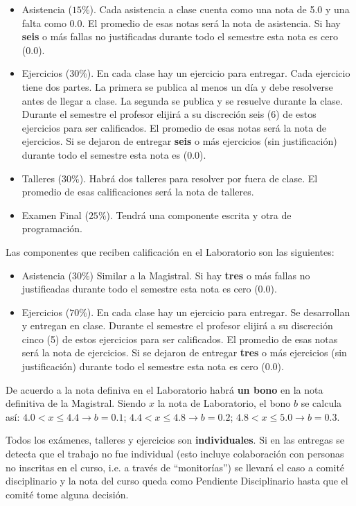 \documentclass[letterpaper,10pt,onecolumn]{article}
\begin{document}
\begin{itemize}
\item Asistencia ($15\%$). Cada asistencia a clase cuenta como una
  nota de 5.0 y una falta como 0.0. El promedio de esas notas ser\'a
  la nota de asistencia. 
  Si hay {\bf seis} o m\'as fallas no justificadas durante todo el
  semestre esta nota es cero (0.0).
\item Ejercicios ($30\%$). En cada clase hay un ejercicio para
  entregar. Cada ejercicio tiene dos partes. 
  La primera se publica al menos un d\'ia y debe resolverse antes de
  llegar a clase.
  La segunda se publica y se resuelve durante la clase.
  Durante el semestre el profesor elijir\'a a su discreci\'on seis (6)
  de estos ejercicios para ser calificados. 
  El promedio de esas notas ser\'a la nota de ejercicios.
  Si se dejaron de entregar {\bf seis} o m\'as ejercicios (sin
  justificaci\'on) durante todo el semestre esta nota es
  (0.0). 
\item Talleres ($30\%$). Habr\'a dos talleres para resolver por fuera de
  clase. El promedio de esas calificaciones ser\'a la nota de talleres.
\item Examen Final ($25\%$). Tendr\'a una componente escrita y otra de
  programaci\'on. 
\end{itemize}

Las componentes que reciben calificaci\'on en el Laboratorio son las
siguientes:
\begin{itemize}
\item Asistencia ($30\%$) Similar a la Magistral.
  Si hay {\bf tres} o m\'as fallas no justificadas durante todo el
  semestre esta nota es cero (0.0).
\item Ejercicios ($70\%$). En cada clase hay un ejercicio para
  entregar. Se desarrollan y entregan en clase.
  Durante el semestre el profesor elijir\'a a su discreci\'on cinco
  (5) de estos ejercicios para ser calificados.
  El promedio de esas notas ser\'a la nota de ejercicios.
  Si se dejaron de entregar {\bf tres} o m\'as ejercicios (sin
  justificaci\'on) durante todo el semestre esta nota es
  cero (0.0). 
\end{itemize}

De acuerdo a la nota definiva en el Laboratorio habr\'a {\bf un bono} en la
nota definitiva de la Magistral. 
Siendo $x$ la nota de Laboratorio, el bono $b$  se calcula as\'i:
$4.0 < x \leq 4.4 \rightarrow b=0.1$; $4.4< x\leq 4.8\rightarrow b=0.2$; $4.8<x
\leq 5.0\rightarrow b=0.3$.

Todos los ex\'amenes, talleres y ejercicios son
\textbf{individuales}.  
Si en las entregas se detecta que el trabajo no fue
individual (esto incluye colaboraci\'on con personas no inscritas en
el curso, i.e. a trav\'es de ``monitor\'ias'') se llevar\'a el caso a
comit\'e disciplinario y la nota del curso queda como Pendiente
Disciplinario hasta que el comit\'e tome alguna decisi\'on. 
\end{document}
